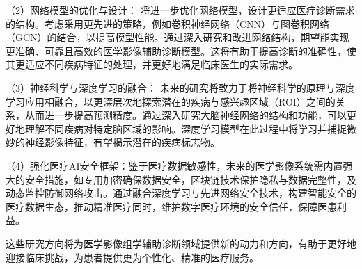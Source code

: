 （2）网络模型的优化与设计： 将进一步优化网络模型，设计更适应医疗诊断需求的结构。考虑采用更先进的策略，例如卷积神经网络（CNN）与图卷积网络（GCN）的结合，以提高模型性能。通过深入研究和改进网络结构，期望能实现更准确、可靠且高效的医学影像辅助诊断模型。这将有助于提高诊断的准确性，使其更适应不同疾病特征的处理，并更好地满足临床医生的实际需求。

（3）神经科学与深度学习的融合： 未来的研究将致力于将神经科学的原理与深度学习应用相融合，以更深层次地探索潜在的疾病与感兴趣区域（ROI）之间的关系，从而进一步提高预测精度。通过深入研究大脑神经网络的结构和功能，可以更好地理解不同疾病对特定脑区域的影响。深度学习模型在此过程中将学习并捕捉微妙的神经影像特征，有望揭示潜在的疾病标志物。

（4）强化医疗AI安全框架：鉴于医疗数据敏感性，未来的医学影像系统需内置强大的安全措施，如专用加密确保数据安全，区块链技术保护隐私与数据完整性，及动态监控防御网络攻击。通过融合深度学习与先进网络安全技术，构建智能安全的医疗数据生态，推动精准医疗同时，维护数字医疗环境的安全信任，保障医患利益。

这些研究方向将为医学影像组学辅助诊断领域提供新的动力和方向，有助于更好地迎接临床挑战，为患者提供更为个性化、精准的医疗服务。